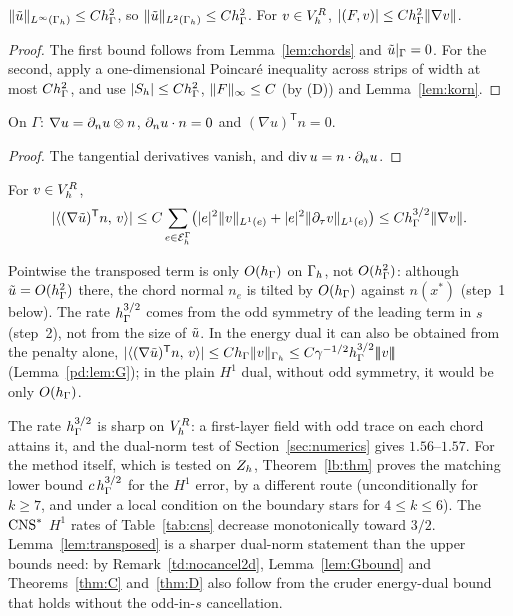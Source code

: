\begin{lemma}[Extension]\label{lem:ext}
$\lVert \tilde u\rVert_{L^\infty(\Gamma_h)}\le Ch_\Gamma^2$, so $\lVert \tilde u\rVert_{L^2(\Gamma_h)}\le Ch_\Gamma^2$. For $v\in V_h^R$, $|(F,v)|\le Ch_\Gamma^2\lVert \nabla v\rVert$.
\end{lemma}

\begin{proof}
The first bound follows from Lemma~\ref{lem:chords} and $\tilde u|_\Gamma=0$. For the second, apply a one-dimensional Poincar\'e inequality across strips of width at most $Ch_\Gamma^2$, and use $|S_h|\le Ch_\Gamma^2$, $\lVert F\rVert_\infty\le C$ (by (D)) and Lemma~\ref{lem:korn}.
\end{proof}

\begin{lemma}\label{lem:wall}
On $\Gamma$: $\nabla u=\partial_n u\otimes n$, $\partial_n u\cdot n=0$ and $(\nabla u)^{\mathsf T}n=0$.
\end{lemma}

\begin{proof}
The tangential derivatives vanish, and $\operatorname{div} u=n\cdot\partial_n u$.
\end{proof}

\begin{lemma}\label{lem:transposed}
For $v\in V_h^R$,
\[
|\langle (\nabla\tilde u)^{\mathsf T}n,\, v\rangle|\le C\sum_{e\in\mathcal E_h^\Gamma}\bigl(|e|^2\lVert v\rVert_{L^1(e)}+|e|^2\lVert \partial_\tau v\rVert_{L^1(e)}\bigr)\le Ch_\Gamma^{3/2}\lVert \nabla v\rVert.
\]
\end{lemma}

Pointwise the transposed term is only $O(h_\Gamma)$ on $\Gamma_h$, not $O(h_\Gamma^2)$: although $\tilde u=O(h_\Gamma^2)$ there, the chord normal $n_e$ is tilted by $O(h_\Gamma)$ against $n(x^\ast)$ (step~1 below). The rate $h_\Gamma^{3/2}$ comes from the odd symmetry of the leading term in $s$ (step~2), not from the size of $\tilde u$. In the energy dual it can also be obtained from the penalty alone, $|\langle (\nabla\tilde u)^{\mathsf T}n,\, v\rangle|\le Ch_\Gamma\lVert v\rVert_{\Gamma_h}\le C\gamma^{-1/2}h_\Gamma^{3/2}|\!|\!|v|\!|\!|$ (Lemma~\ref{pd:lem:G}); in the plain $H^1$ dual, without odd symmetry, it would be only $O(h_\Gamma)$.

The rate $h_\Gamma^{3/2}$ is sharp on $V_h^R$: a first-layer field with odd trace on each chord attains it, and the dual-norm test of Section~\ref{sec:numerics} gives $1.56$--$1.57$. For the method itself, which is tested on $Z_h$, Theorem~\ref{lb:thm} proves the matching lower bound $c\,h_\Gamma^{3/2}$ for the $H^1$ error, by a different route (unconditionally for $k\ge7$, and under a local condition on the boundary stars for $4\le k\le6$). The $\mathrm{CNS}^\ast$ $H^1$ rates of Table~\ref{tab:cns} decrease monotonically toward $3/2$. Lemma~\ref{lem:transposed} is a sharper dual-norm statement than the upper bounds need: by Remark~\ref{td:nocancel2d}, Lemma~\ref{lem:Gbound} and Theorems~\ref{thm:C} and~\ref{thm:D} also follow from the cruder energy-dual bound that holds without the odd-in-$s$ cancellation.

